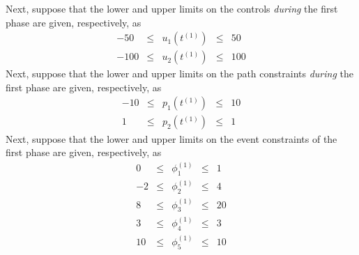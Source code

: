 \documentclass[10pt]{article}
\begin{document}
    	Next, suppose that the lower and upper limits on the controls
    	{\em during} the first phase are given, respectively, as
    	\begin{displaymath}
    	\begin{array}{rcccr}
    	-50 & \leq & u_1(t^{(1)}) & \leq & 50 \\
    	-100 & \leq & u_2(t^{(1)})& \leq & 100
    	\end{array}
    	\end{displaymath}
    	Next, suppose that the lower and upper limits on the path constraints
    	{\em during} the first phase are given, respectively, as
    	\begin{displaymath}
    	\begin{array}{rcccr}
    	-10 & \leq & p_1(t^{(1)}) & \leq & 10 \\
    	1 & \leq & p_2(t^{(1)})& \leq & 1
    	\end{array}
    	\end{displaymath}
    	Next, suppose that the lower and upper limits on the event constraints
    	of the first phase are given, respectively, as
    	\begin{displaymath}
    	\begin{array}{rcccr}
    	0 & \leq & \phi_1^{(1)} & \leq & 1 \\
    	-2 & \leq & \phi_2^{(1)} & \leq & 4 \\
    	8 & \leq & \phi_3^{(1)} & \leq & 20 \\
    	3 & \leq & \phi_4^{(1)} & \leq & 3 \\
    	10 & \leq & \phi_5^{(1)} & \leq & 10
    	\end{array}
    	\end{displaymath}
    	
\end{document}
